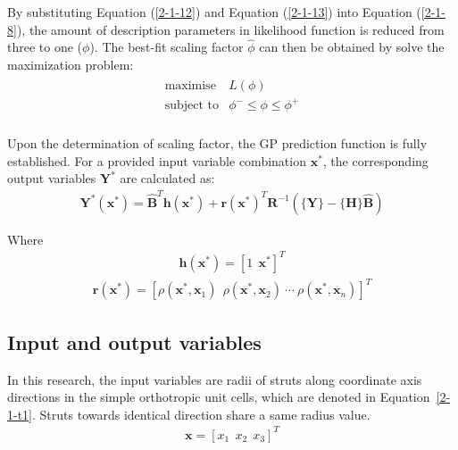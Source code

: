 \documentclass[12pt]{extbook}
\begin{document}
By substituting Equation (\ref{2-1-12}) and Equation (\ref{2-1-13}) into Equation (\ref{2-1-8}), the amount of description parameters in likelihood function is reduced from three to one ($\phi$). The best-fit scaling factor $\hat{\phi}$ can then be obtained by solve the maximization problem:
\begin{equation}
\begin{split}
\begin{array}{ll}
\text{maximise} & L(\phi)\\
\text{subject to} & \phi^- \leq \phi \leq \phi^+\\
\end{array}
\end{split}
\label{2-1-14}
\end{equation}

Upon the determination of scaling factor, the GP prediction function is fully established. For a provided input variable combination $\bm{x}^*$, the corresponding output variables $\bm{Y}^*$ are calculated as:
\begin{equation}
\begin{split}
\bm{Y}^*(\bm{x}^*) = \hat{\bm{B}}^T\bm{h}(\bm{x}^*) + \bm{r}(\bm{x}^*)^T\bm{R}^{-1}(\{\bm{Y}\}- \{\bm{H}\}\hat{\bm{B}})
\end{split}
\label{2-1-15}
\end{equation}

Where
\begin{equation}
\begin{split}
\bm{h}(\bm{x}^*) = [1~~\bm{x}^*]^T
\end{split}
\label{2-1-16}
\end{equation}
\begin{equation}
\begin{split}
\bm{r}(\bm{x}^*) = [\rho(\bm{x}^*, \bm{x}_1)~~\rho(\bm{x}^*, \bm{x}_2)~\cdots~\rho(\bm{x}^*, \bm{x}_n)]^T
\end{split}
\label{2-1-17}
\end{equation}

\subsection{Input and output variables}

In this research, the input variables are radii of struts along coordinate axis directions in the simple orthotropic unit cells, which are denoted in Equation~\ref{2-1-t1}. Struts towards identical direction share a same radius value.
\begin{equation}
\begin{split}
\bm{x} = [x_1~~x_2~~x_3]^T
\end{split}
\label{2-1-t1}
\end{equation}
\end{document}
